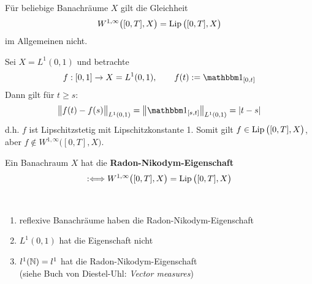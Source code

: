 Für beliebige Banachräume $X$ gilt die Gleichheit
\begin{align*}
W^{1,\infty}\big([0,T],X\big)=\operatorname{Lip}\big([0,T],X\big)
\end{align*}
im Allgemeinen nicht.

\begin{beispiel}
Sei $X=L^1(0,1)$ und  betrachte
\begin{align*}
f:[0,1]\to X=L^1(0,1),\qquad f(t):=\indi_{[0,t]}
\end{align*}
Dann gilt für $t\geq s$:
\begin{align*}
\big\Vert f(t)-f(s)\big\Vert_{L^1(0,1)}
=\left\Vert\indi_{[s,t]}\right\Vert_{L^1(0,1)}
=|t-s|
\end{align*}
d.h. $f$ ist Lipschitzstetig mit Lipschitzkonstante 1.
Somit gilt $f\in\operatorname{Lip}\big([0,T],X\big)$, aber $f\not\in W^{1,\infty}\big([0,T],X\big)$.
\end{beispiel}

\begin{definition}
Ein Banachraum $X$ hat die \textbf{Radon-Nikodym-Eigenschaft}
\begin{align*}
:\Longleftrightarrow W^{1,\infty}\big([0,T],X\big)=\operatorname{Lip}\big([0,T],X\big)
\end{align*}
\end{definition}

\begin{beispiel}\
\begin{enumerate}
\item reflexive Banachräume haben die Radon-Nikodym-Eigenschaft
\item $L^1(0,1)$ hat die Eigenschaft nicht
\item $l^1(\mathbb{N})=l^1$ hat die Radon-Nikodym-Eigenschaft\\
(siehe Buch von Diestel-Uhl: \textit{Vector measures})
\end{enumerate}
\end{beispiel}

